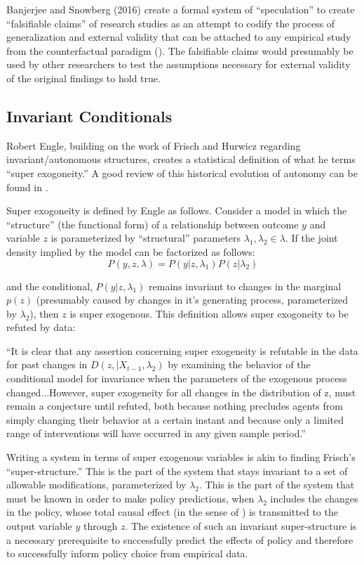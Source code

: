 \documentclass[a4paper,12pt]{article}
\begin{document}
Banjerjee and Snowberg (2016) create a formal system of ``speculation'' to create ``falsifiable claims'' of research studies as an attempt to codify the process of generalization and external validity that can be attached to any empirical study from the counterfactual paradigm (\cite{Snowberg2016}). The falsifiable claims would presumably be used by other researchers to test the assumptions necessary for external validity of the original findings to hold true. 


\subsection*{Invariant Conditionals}

Robert Engle, building on the work of Frisch and Hurwicz regarding invariant/autonomous structures, creates a statistical definition of what he terms ``super exogoneity.'' A good review of this historical evolution of autonomy can be found in \cite{Aldrich1989}.

Super exogoneity is defined by Engle as follows. Consider a model in which the ``structure'' (the functional form) of a relationship between outcome $y$ and variable $z$ is parameterized by ``structural'' parameters $\lambda_1, \lambda_2 \in \lambda$. If the joint density implied by the model can be factorized as follows: 
%
$$
P(y, z, \lambda) = P(y | z, \lambda_1)P(z | \lambda_2)
$$

and the conditional, $P(y | z, \lambda_1)$ remains invariant to changes in the marginal $p(z)$ (presumably caused by changes in it's generating process, parameterized by $\lambda_2$), then $z$ is super exogenous. This definition allows super exogoneity to be refuted by data:  

\begin{displayquote}
``It is clear that any assertion concerning super exogeneity is refutable in the data for past changes in $D(z, | X_{t-1}, \lambda_2)$ by examining the behavior of the conditional model for invariance when the parameters of the exogenous process changed...However, super exogeneity for all changes in the distribution of z, must remain a conjecture until refuted, both because nothing precludes agents from simply changing their behavior at a certain instant and because only a limited range of interventions will have occurred in any given sample period.''  
\end{displayquote}

Writing a system in terms of super exogenous variables is akin to finding Frisch's ``super-structure.'' This is the part of the system that stays invariant to a set of allowable modifications, parameterized by $\lambda_2$. This is the part of the system that must be known in order to make policy predictions, when $\lambda_2$ includes the changes in the policy, whose total causal effect (in the sense of \cite{Pearl2000}) is transmitted to the output variable $y$ through $z$. The existence of such an invariant super-structure is a necessary prerequisite to successfully predict the effects of policy and therefore to successfully inform policy choice from empirical data.
\end{document}
